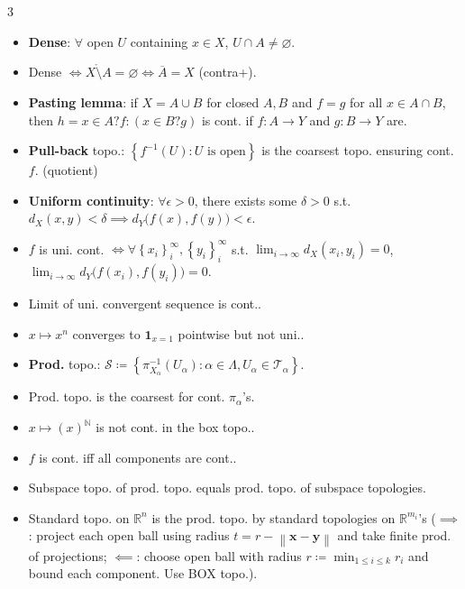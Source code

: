 \documentclass[10pt]{article}
\newcommand{\R}{\mathbb{R}} %
\newcommand{\N}{\mathbb{N}} %
\newcommand{\norm}[1]{\left\lVert#1\right\rVert} %
\begin{document}
\begin{multicols*}{3}
\begin{itemize}
\begin{enumerate}
                \item $\forall x \in X$ and any open $V \subseteq Y$ with $f\left(x\right) \in V$, there is an open set $U \subseteq X$ s.t. $x \in U$ and $f\left(U\right) \subseteq V$.
            \end{enumerate}
            \item \textbf{Dense}: $\forall$ open $U$ containing $x \in X$, $U \cap A \neq \varnothing$.
            \item Dense $\iff \mathring{X \setminus A} = \varnothing \iff \overline{A} = X$ (contra+).
            \item \textbf{Pasting lemma}: if $X = A \cup B$ for closed $A, B$ and $f = g$ for all $x \in A \cap B$, then $h = x \in A ? f : \left(x \in B ? g\right)$ is cont. if $f \colon A \to Y$ and $g \colon B \to Y$ are.
            \item \textbf{Pull-back} topo.: $\left\{f^{-1}\left(U\right) \colon U \textrm{ is open}\right\}$ is the coarsest topo. ensuring cont. $f$. (quotient)
            \item \textbf{Uniform continuity}: $\forall \epsilon > 0$, there exists some $\delta > 0$ s.t. $d_X\left(x, y\right) < \delta \implies d_Y\bigl(f\left(x\right), f\left(y\right)\bigr) < \epsilon$.
            \item $f$ is uni. cont. $\iff \forall \left\{x_i\right\}_i^{\infty}, \left\{y_i\right\}_{i}^{\infty}$ s.t. $\lim_{i \to \infty}d_X\left(x_i, y_i\right) = 0$, $\lim_{i \to \infty}d_Y\bigl(f\left(x_i\right), f\left(y_i\right)\bigr) = 0$.
            \item Limit of uni. convergent sequence is cont..
            \item $x \mapsto x^n$ converges to $\mathbf{1}_{x = 1}$ pointwise but not uni..
            \item \textbf{Prod.} topo.: $\mathcal{S} \coloneqq \left\{\pi_{X_{\alpha}}^{-1}\left(U_{\alpha}\right) \colon \alpha \in \Lambda, U_{\alpha} \in \mathcal{T}_{\alpha}\right\}$.
            \item Prod. topo. is the coarsest for cont. $\pi_{\alpha}$'s.
            \item $x \mapsto (x)^{\N}$ is not cont. in the box topo..
            \item $f$ is cont. iff all components are cont..
            \item Subspace topo. of prod. topo. equals prod. topo. of subspace topologies.
            \item Standard topo. on $\R^n$ is the prod. topo. by standard topologies on $\R^{m_i}$'s ($\implies$: project each open ball using radius $t = r - \norm{\bm{x - y}}$ and take finite prod. of projections; $\impliedby$: choose open ball with radius $r \coloneqq \min_{1 \leq i \leq k}r_i$ and bound each component. Use BOX topo.).

\end{itemize}
\end{multicols*}
\end{document}

